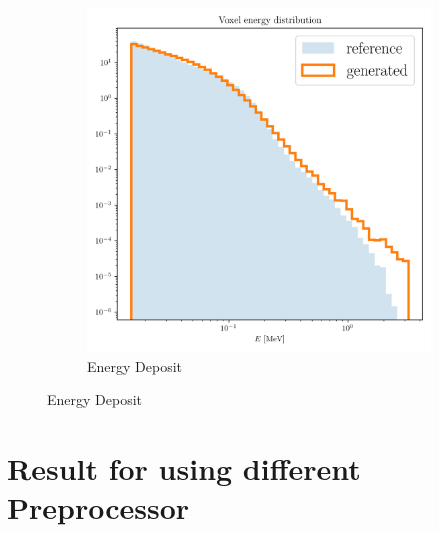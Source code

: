 \begin{figure}[htbp]
\begin{subfigure}[b]{0.3\textwidth}
        \label{fig:a2_6}
    \end{subfigure}
    \hfill
    \begin{subfigure}[b]{0.3\textwidth}
        \centering
        \includegraphics[width=\textwidth]{Figures/a2_6.png}
        \caption{Energy Deposit}
        \label{fig:a2_7}
    \end{subfigure}
\end{figure}
\newpage
\section{Result for using different Preprocessor}


